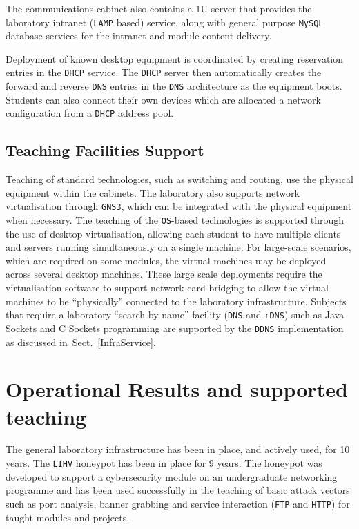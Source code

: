 \documentclass{ieeeaccess}
\begin{document}
The communications cabinet also contains a 1U server that provides the
laboratory intranet (\texttt{LAMP} based) service, along with general purpose
\texttt{MySQL} database services for the intranet and module content delivery.

Deployment of known desktop equipment is coordinated by creating reservation
entries in the \texttt{DHCP} service. The \texttt{DHCP} server then
automatically creates the forward and reverse \texttt{DNS} entries in the
\texttt{DNS} architecture as the equipment boots. Students can also connect
their own devices which are allocated a network configuration from a
\texttt{DHCP} address pool.

\subsection{Teaching Facilities Support}

Teaching of standard technologies, such as switching and routing, use the
physical equipment within the cabinets. The laboratory also supports network
virtualisation through \texttt{GNS3}, which can be integrated with the physical
equipment when necessary. The teaching of the \texttt{OS}-based technologies is
supported through the use of desktop virtualisation, allowing each student to
have multiple clients and servers running simultaneously on a single machine.
For large-scale scenarios, which are required on some modules, the virtual
machines may be deployed across several desktop machines. These large scale
deployments require the virtualisation software to support network card
bridging to allow the virtual machines to be ``physically'' connected to the
laboratory infrastructure.  Subjects that require a laboratory
``search-by-name'' facility (\texttt{DNS} and \texttt{rDNS}) such as Java
Sockets and C Sockets programming are supported by the \texttt{DDNS}
implementation as discussed in~Sect.~\ref{InfraService}.

\section{Operational Results and supported teaching}\label{sec:Results}

The general laboratory infrastructure has been in place, and actively used, for
10 years. The \texttt{LIHV} honeypot has been in place for 9 years. The
honeypot was developed to support a cybersecurity module on an undergraduate
networking programme and has been used successfully in the teaching of basic
attack vectors such as port analysis, banner grabbing and service interaction
(\texttt{FTP} and \texttt{HTTP}) for taught modules and projects.
\end{document}
